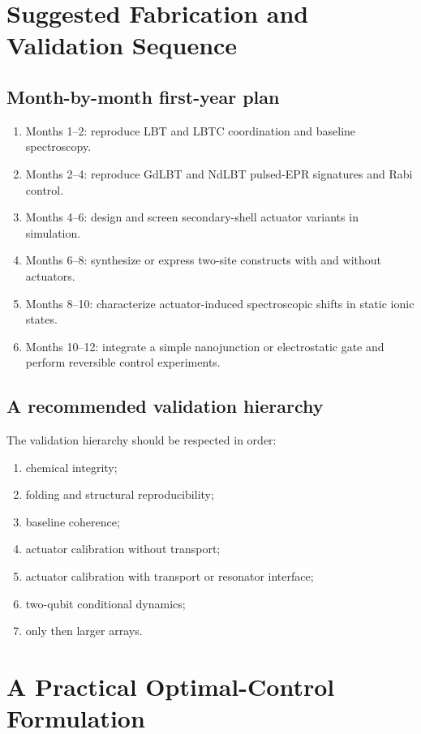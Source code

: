 \documentclass[11pt]{report}
\theoremstyle{definition}
\begin{document}
\chapter{Suggested Fabrication and Validation Sequence}

\section{Month-by-month first-year plan}
\begin{enumerate}[leftmargin=2em]
\item Months 1--2: reproduce LBT and LBTC coordination and baseline spectroscopy.
\item Months 2--4: reproduce GdLBT and NdLBT pulsed-EPR signatures and Rabi control.
\item Months 4--6: design and screen secondary-shell actuator variants in simulation.
\item Months 6--8: synthesize or express two-site constructs with and without actuators.
\item Months 8--10: characterize actuator-induced spectroscopic shifts in static ionic states.
\item Months 10--12: integrate a simple nanojunction or electrostatic gate and perform reversible control experiments.
\end{enumerate}

\section{A recommended validation hierarchy}
The validation hierarchy should be respected in order:

\begin{enumerate}[leftmargin=2em]
\item chemical integrity;
\item folding and structural reproducibility;
\item baseline coherence;
\item actuator calibration without transport;
\item actuator calibration with transport or resonator interface;
\item two-qubit conditional dynamics;
\item only then larger arrays.
\end{enumerate}

\chapter{A Practical Optimal-Control Formulation}
\end{document}
